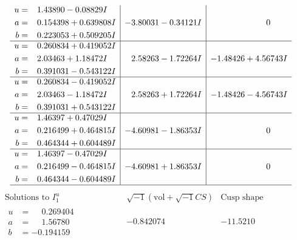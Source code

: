 \documentclass[1p]{elsarticle_modified}
\theoremstyle{definition}
\newcommand{\I}{\sqrt{-1}}
\begin{document}
$$\begin{array}{c|c|c}
\begin{aligned}
u &= \phantom{-}1.43890 - 0.08829 I \\
a &= \phantom{-}0.154398 + 0.639808 I \\
b &= \phantom{-}0.223053 + 0.509205 I\end{aligned}
 & -3.80031 - 0.34121 I & \phantom{-0.000000 } 0 \\ \hline\begin{aligned}
u &= \phantom{-}0.260834 + 0.419052 I \\
a &= \phantom{-}2.03463 + 1.18472 I \\
b &= \phantom{-}0.391031 - 0.543122 I\end{aligned}
 & \phantom{-}2.58263 - 1.72264 I & -1.48426 + 4.56743 I \\ \hline\begin{aligned}
u &= \phantom{-}0.260834 - 0.419052 I \\
a &= \phantom{-}2.03463 - 1.18472 I \\
b &= \phantom{-}0.391031 + 0.543122 I\end{aligned}
 & \phantom{-}2.58263 + 1.72264 I & -1.48426 - 4.56743 I \\ \hline\begin{aligned}
u &= \phantom{-}1.46397 + 0.47029 I \\
a &= \phantom{-}0.216499 + 0.464815 I \\
b &= \phantom{-}0.464344 + 0.604489 I\end{aligned}
 & -4.60981 - 1.86353 I & \phantom{-0.000000 } 0 \\ \hline\begin{aligned}
u &= \phantom{-}1.46397 - 0.47029 I \\
a &= \phantom{-}0.216499 - 0.464815 I \\
b &= \phantom{-}0.464344 - 0.604489 I\end{aligned}
 & -4.60981 + 1.86353 I & \phantom{-0.000000 } 0\\
 \hline 
 \end{array}$$\newpage$$\begin{array}{c|c|c}  
\text{Solutions to }I^u_{1}& \I (\text{vol} + \sqrt{-1}CS) & \text{Cusp shape}\\
 \hline 
\begin{aligned}
u &= \phantom{-}0.269404\phantom{ +0.000000I} \\
a &= \phantom{-}1.56780\phantom{ +0.000000I} \\
b &= -0.194159\phantom{ +0.000000I}\end{aligned}
 & -0.842074\phantom{ +0.000000I} & -11.5210\phantom{ +0.000000I} \\ \hline\begin{aligned}

\end{aligned}
\end{array}$$
\end{document}
